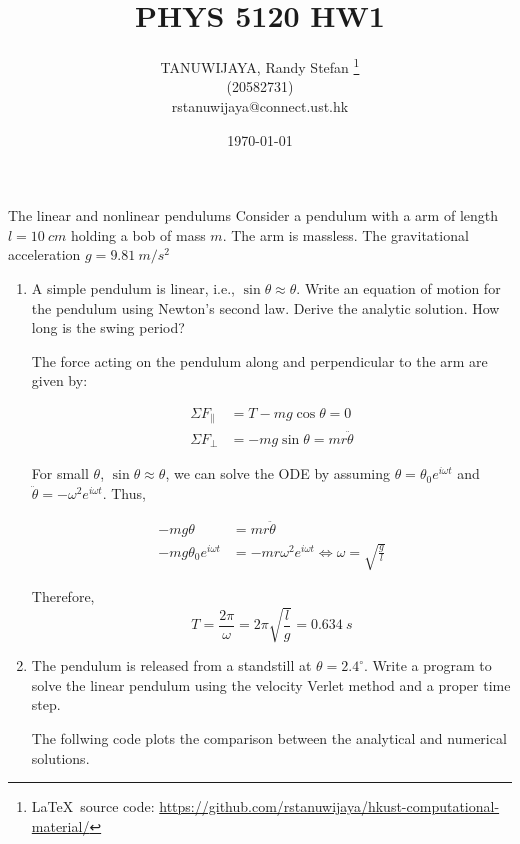 \documentclass{article}
\title{PHYS 5120 HW1}
\author{TANUWIJAYA, Randy Stefan \footnote{\LaTeX\ source code: \url{https://github.com/rstanuwijaya/hkust-computational-material/}}\\ (20582731) \\ rstanuwijaya@connect.ust.hk}
\affil{Department of Physics - HKUST}
\date{\today}
\begin{document}
\maketitle
\begin{section}{The linear and nonlinear pendulums}
Consider a pendulum with a arm of length $l = \SI{10}{cm}$ holding a bob of mass $m$. The arm is massless. The gravitational acceleration $g = \SI{9.81}{m/s^2}$
\begin{enumerate}[1.]
	\item A simple pendulum is linear, i.e., $\sin{\theta} \approx \theta$. Write an equation of motion for the pendulum using Newton's second law. Derive the analytic solution. How long is the swing period?

	\begin{tcolorbox}
		The force acting on the pendulum along and perpendicular to the arm are given by:

		\begin{align}
			\Sigma F_{\parallel} & = T - m g \cos{\theta} = 0               \\
			\Sigma F_{\perp}     & = - m g \sin{\theta} = m r \ddot{\theta}
		\end{align}

		For small $\theta$, $\sin{\theta} \approx \theta$, we can solve the ODE by assuming $\theta = \theta_0 e^{i \omega t}$ and $\ddot{\theta} = - \omega^2 e^{i \omega t}$. Thus,

		\begin{align*}
			- m g \theta                  & = m r \ddot{\theta}                                                \\
			- m g \theta_0 e^{i \omega t} & = - m r  \omega^2 e^{i \omega t}  \iff \omega = \sqrt{\frac{g}{l}}
		\end{align*}

		Therefore,
		\begin{equation}
			\boxed{
				T = \frac{2\pi}{\omega} = 2\pi \sqrt{\frac{l}{g}} = \SI{0.634}{s}
			}
		\end{equation}
	\end{tcolorbox}

	\newpage
	\item The pendulum is released from a standstill at $\theta=2.4^\circ$. Write a program to solve the linear pendulum using the velocity Verlet method and a	proper time step.

	\begin{tcolorbox}[breakable]
		The follwing code plots the comparison between the analytical and numerical solutions.



\end{tcolorbox}
\end{enumerate}
\end{section}
\end{document}
